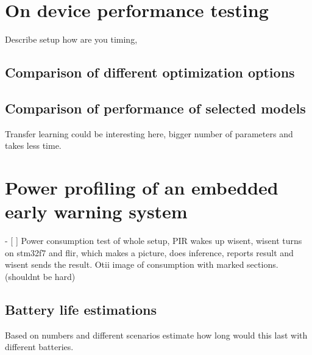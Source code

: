 \section{ On device performance testing}
Describe setup
      how are you timing, 
\subsection{ Comparison of different optimization options}
\subsection{ Comparison of performance of selected models}
    Transfer learning could be interesting here, bigger number of parameters and takes less time.






\section{ Power profiling of an embedded early warning system}
- [ ] Power consumption test of whole setup, 
      PIR wakes up wisent, 
      wisent turns on stm32f7 and flir, 
      which makes a picture, does inference, reports result and wisent sends the result. 
      Otii image of consumption with marked sections.(shouldnt be hard)

\subsection{ Battery life estimations}
Based on numbers and different scenarios estimate how long would this last with different batteries.
